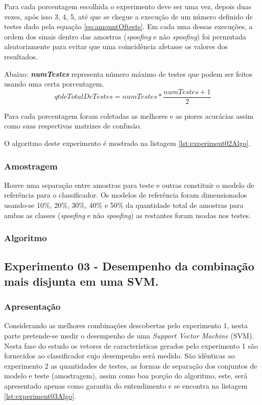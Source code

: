 \begin{myenv}{1.5}
					\par Para cada porcentagem escolhida o experimento deve ser uma vez, depois duas vezes, após isso 3, 4, 5, até que se chegue a execução de um número definido de testes dado pela equação \ref{eq:amountOftests}. Em cada uma dessas execuções, a ordem dos sinais dentro das amostras (\textit{spoofing} e não \textit{spoofing}) foi permutada aleatoriamente para evitar que uma coincidência afetasse os valores dos resultados.
					
					\par Abaixo: \textit{\textbf{numTestes}} representa número máximo de testes que podem ser feitos usando uma certa porcentagem.
					\begin{equation}
						\label{eq:amountOftests}
						qtdeTotalDeTestes= numTestes * \dfrac{numTestes + 1}{2}
					\end{equation}
					
					\par Para cada porcentagem foram coletadas as melhores e as piores acurácias assim como suas respectivas matrizes de confusão.
					
					\par O algoritmo deste experimento é mostrado na listagem \ref{lst:experiment02Algo}.
									
				\subsubsection{Amostragem}
					\par Houve uma separação entre amostras para teste e outras constituir o modelo de referência para o classificador. Os modelos de referência foram dimensionados usando-se 10\%, 20\%, 30\%, 40\% e 50\% da quantidade total de amostras para ambas as classes (\textit{spoofing} e não \textit{spoofing}) as restantes foram usadas nos testes.	
				\subsubsection{Algoritmo}
				

			\subsection{Experimento 03 - Desempenho da combinação mais disjunta em uma SVM.}
			\label{chap:propApproach:sec:Experimento03}
				\subsubsection{Apresentação}
					\par Considerando as melhores combinações descobertas pelo experimento 1, nesta parte pretende-se medir o desempenho de uma \textit{Support Vector Machine} (SVM). Nesta fase do estudo os vetores de características gerados pelo experimento 1 são fornecidos ao classificador cujo desempenho será medido. São idênticas ao experimento 2 as quantidades de testes, as formas de separação dos conjuntos de modelo e teste (amostragem), assim como boa porção do algoritmo, este, será apresentado apenas como garantia do entendimento e se encontra na listagem \ref{lst:experiment03Algo}.


\end{myenv}
